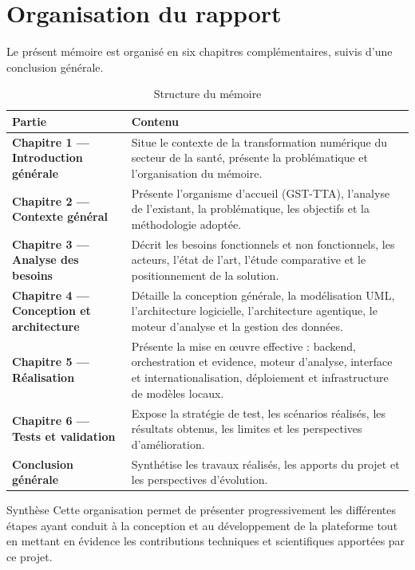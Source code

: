 \vspace{0.5cm}

\section{Organisation du rapport}

Le présent mémoire est organisé en six chapitres complémentaires, suivis d'une conclusion générale.

\begin{table}[H]
\centering
\caption{Structure du mémoire}
\label{tab:structure}
\begin{tabularx}{\textwidth}{>{\bfseries}p{4.5cm}Y}
\toprule
\textbf{Partie} & \textbf{Contenu} \\
\midrule
Chapitre 1 --- Introduction générale & Situe le contexte de la transformation numérique du secteur de la santé, présente la problématique et l'organisation du mémoire. \\
\midrule
Chapitre 2 --- Contexte général & Présente l'organisme d'accueil (GST-TTA), l'analyse de l'existant, la problématique, les objectifs et la méthodologie adoptée. \\
\midrule
Chapitre 3 --- Analyse des besoins & Décrit les besoins fonctionnels et non fonctionnels, les acteurs, l'état de l'art, l'étude comparative et le positionnement de la solution. \\
\midrule
Chapitre 4 --- Conception et architecture & Détaille la conception générale, la modélisation UML, l'architecture logicielle, l'architecture agentique, le moteur d'analyse et la gestion des données. \\
\midrule
Chapitre 5 --- Réalisation & Présente la mise en œuvre effective : backend, orchestration et evidence, moteur d'analyse, interface et internationalisation, déploiement et infrastructure de modèles locaux. \\
\midrule
Chapitre 6 --- Tests et validation & Expose la stratégie de test, les scénarios réalisés, les résultats obtenus, les limites et les perspectives d'amélioration. \\
\midrule
Conclusion générale & Synthétise les travaux réalisés, les apports du projet et les perspectives d'évolution. \\
\bottomrule
\end{tabularx}
\end{table}

\begin{resultbox}{Synthèse}
Cette organisation permet de présenter progressivement les différentes étapes ayant conduit à la conception et au développement de la plateforme tout en mettant en évidence les contributions techniques et scientifiques apportées par ce projet.
\end{resultbox}